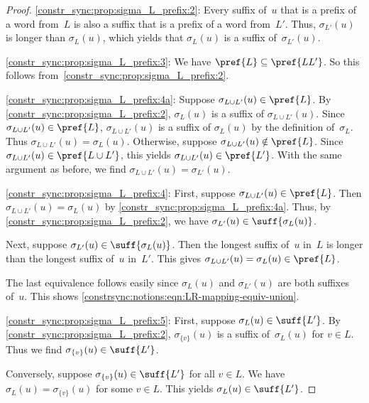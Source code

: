 \begin{proof}
\ref{constr_sync:prop:sigma_L_prefix:2}: Every suffix of~$u$ that is a prefix of a word from~$L$
is also a suffix that is a prefix of a word from~$L'$. Thus, $\sigma_{L'}(u)$
is longer than $\sigma_{L}(u)$, which yields that $\sigma_{L}(u)$
is a suffix of~$\sigma_{L'}(u)$.

\ref{constr_sync:prop:sigma_L_prefix:3}: We have $\pref{L} \subseteq \pref{L L'}$.
So this follows from~\cref{constr_sync:prop:sigma_L_prefix:2}.	

\ref{constr_sync:prop:sigma_L_prefix:4a}: Suppose $\sigma_{L \cup L'}(u) \in \pref{L}$.
By \cref{constr_sync:prop:sigma_L_prefix:2}, $\sigma_L(u)$ is a suffix of $\sigma_{L\cup L'}(u)$.
Since $\sigma_{L \cup L'}(u)  \in \pref{L}$, $\sigma_{L\cup L'}(u)$
is a suffix of $\sigma_L(u)$ by the definition of~$\sigma_L$.
Thus $\sigma_{L\cup L'}(u) = \sigma_{L}(u)$.
%
 Otherwise, suppose $\sigma_{L \cup L'}(u) \notin \pref{L}$. 
 Since $\sigma_{L \cup L'}(u) \in \pref{L \cup L'}$,
 this yields $\sigma_{L \cup L'}(u) \in \pref{L'}$.
 With the same argument as before, we find 
 $\sigma_{L \cup L'}(u) = \sigma_{L'}(u)$.

\ref{constr_sync:prop:sigma_L_prefix:4}: First, suppose $\sigma_{L \cup L'}(u)  \in \pref{L}$.
 Then $\sigma_{L \cup L'}(u) = \sigma_L(u)$ by \cref{constr_sync:prop:sigma_L_prefix:4a}.
 Thus, by \cref{constr_sync:prop:sigma_L_prefix:2}, we have $\sigma_{L'}(u) \in \suff{\sigma_L(u)}$.
 
 Next, suppose $\sigma_{L'}(u) \in \suff{\sigma_L(u)}$. 
 Then the longest suffix of~$u$ in~$L$ is longer than the longest
 suffix of~$u$ in~$L'$.
 This gives $\sigma_{L \cup L'}(u) = \sigma_L(u) \in \pref{L}$.
 
 The last equivalence follows easily since $\sigma_L(u)$ and $\sigma_{L'}(u)$
 are both suffixes of~$u$. This shows \cref{constrsync:notions:eqn:LR-mapping-equiv-union}.
 
\ref{constr_sync:prop:sigma_L_prefix:5}: First, suppose $\sigma_L(u) \in \suff{L'}$.
By \cref{constr_sync:prop:sigma_L_prefix:2}, $\sigma_{\{v\}}(u)$ is a suffix of~$\sigma_L(u)$ for $v \in L$.
Thus we find $\sigma_{\{v\}}(u) \in \suff{L'}$.

Conversely, suppose $\sigma_{\{v\}}(u) \in \suff{L'}$ for all $v \in L$.
We have $\sigma_L(u) = \sigma_{\{v\}}(u)$ for some $v \in L$.
This yields $\sigma_L(u) \in \suff{L'}$.


\end{proof}
